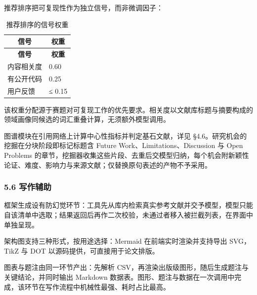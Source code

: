 \documentclass[UTF8,fontset=windows,zihao=5,a4paper]{ctexart}
\begin{document}
推荐排序把可复现性作为独立信号，而非微调因子：

\begin{longtable}{@{}p{}p{}@{}}
\caption{推荐排序的信号权重}\\
\toprule
\multicolumn{1}{c}{\textbf{信号}} & \multicolumn{1}{c}{\textbf{权重}} \\
\midrule
\endfirsthead
\toprule
\multicolumn{1}{c}{\textbf{信号}} & \multicolumn{1}{c}{\textbf{权重}} \\
\midrule
\endhead
\bottomrule
\endfoot
内容相关度 & 0.60 \\
有公开代码 & 0.25 \\
用户反馈 & ≤ 0.15 \\
\end{longtable}

该权重分配源于赛题对可复现工作的优先要求。相关度以文献库标题与摘要构成的领域画像同候选的词汇重叠计算，无须额外模型调用。

图谱模块在引用网络上计算中心性指标并判定基石文献，详见 §4.6。研究机会的挖掘在分块阶段即标记标题含 Future Work、Limitations、Discussion 与 Open Problems 的章节，挖掘器收集这些片段、去重后交模型归纳，每个机会附新颖性论证、难度、影响力与来源文献；仅替换原句表述的产物不予采用。

\subsubsection*{5.6 写作辅助}
框架生成设有防幻觉环节：工具先从库内检索真实参考文献并交予模型，模型只能自该清单中选取；结果返回后再作二次校验，未通过者移入被拦截列表，在界面中单独呈现。

架构图支持三种形式，按用途选择：Mermaid 在前端实时渲染并支持导出 SVG，TikZ 与 DOT 以源码提供，可直接用于论文排版。

图表与题注由同一环节产出：先解析 CSV，再渲染出版级图形，随后生成题注与关键结论，并同时输出 Markdown 数据表。图形、题注与数据在一次调用中完成，该环节在写作流程中机械性最强、耗时占比最高。
\end{document}
